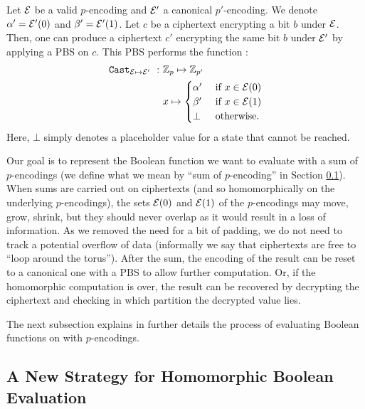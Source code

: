 \begin{property} 
    \label{prop:cast_valid_to_canonical}
    Let $\mathcal{E}$ be a valid $p$-encoding and $\mathcal{E}'$ a canonical $p'$-encoding. We denote $\alpha' = \mathcal{E}'(0)$ and $\beta' = \mathcal{E}'(1)$. Let $c$ be a ciphertext encrypting a bit $b$ under $\mathcal{E}$. Then, one can produce a ciphertext $c'$ encrypting the same bit $b$ under $\mathcal{E}'$ by applying a PBS on $c$. This PBS performs the function :
    \[
        \begin{aligned}
            \texttt{Cast}_{\mathcal{E} \mapsto \mathcal{E}'}~:~& \mathbb{Z}_p \mapsto \mathbb{Z}_{p'}\\
            & x \mapsto \begin{cases}
                            \alpha' & \text{ if } x \in \mathcal{E}(0)\\
                            \beta' & \text{ if } x \in \mathcal{E}(1)\\
                            \bot & \text{ otherwise.}
                        \end{cases}
        \end{aligned}
    \]
    Here, $\bot$ simply denotes a placeholder value for a state that cannot be reached.
\end{property}



Our goal is to represent the Boolean function we want to evaluate with a sum of $p$-encodings (we define what we mean by ``sum of $p$-encoding'' in Section \ref{sec:p_encodings_new_strategy}).  When sums are carried out on ciphertexts (and so homomorphically on the underlying $p$-encodings), the sets $\mathcal{E}(0)$ and $\mathcal{E}(1)$ of the $p$-encodings may move, grow, shrink, but they should never overlap as it would result in a loss of information. As we removed the need for a bit of padding, we do not need to track a potential overflow of data (informally we say that ciphertexts are free to ``loop around the torus''). After the sum, the encoding of the result can be reset to a canonical one with a PBS to allow further computation. Or, if the homomorphic computation is over, the result can be recovered by decrypting the ciphertext and checking in which partition the decrypted value lies.


The next subsection explains in further details the process of evaluating Boolean functions on with $p$-encodings.



\subsection{A New Strategy for Homomorphic Boolean Evaluation}
\label{sec:p_encodings_new_strategy}



